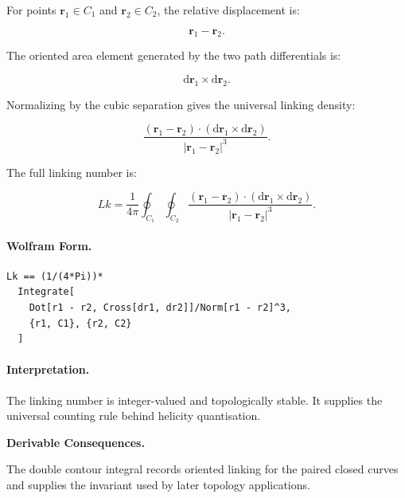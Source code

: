 For points $\mathbf{r}_1\in C_1$ and $\mathbf{r}_2\in C_2$, the relative displacement is:

\begin{equation}
\mathbf{r}_1-\mathbf{r}_2 .
\end{equation}

The oriented area element generated by the two path differentials is:

\begin{equation}
\mathrm{d}\mathbf{r}_1\times \mathrm{d}\mathbf{r}_2 .
\end{equation}

Normalizing by the cubic separation gives the universal linking density:

\begin{equation}
\frac{
(\mathbf{r}_1-\mathbf{r}_2)
\cdot
(\mathrm{d}\mathbf{r}_1\times \mathrm{d}\mathbf{r}_2)
}{
|\mathbf{r}_1-\mathbf{r}_2|^3
}.
\end{equation}

The full linking number is:

\begin{equation}
\boxed{
Lk
=
\frac{1}{4\pi}
\oint_{C_1}
\oint_{C_2}
\frac{
(\mathbf{r}_1-\mathbf{r}_2)
\cdot
(\mathrm{d}\mathbf{r}_1\times \mathrm{d}\mathbf{r}_2)
}{
|\mathbf{r}_1-\mathbf{r}_2|^3
}.
}
\end{equation}

\paragraph{Wolfram Form.}
\begin{verbatim}
Lk == (1/(4*Pi))*
  Integrate[
    Dot[r1 - r2, Cross[dr1, dr2]]/Norm[r1 - r2]^3,
    {r1, C1}, {r2, C2}
  ]
\end{verbatim}

\paragraph{Interpretation.}
The linking number is integer-valued and topologically stable. It supplies the universal counting rule behind helicity quantisation.
\endgroup

\par\vspace{0.35em}
\noindent\textbf{Derivable Consequences.}\quad
\begingroup
\footnotesize
\raggedright
The double contour integral records oriented linking for the paired closed curves and supplies the invariant used by later topology applications.
\par\endgroup

